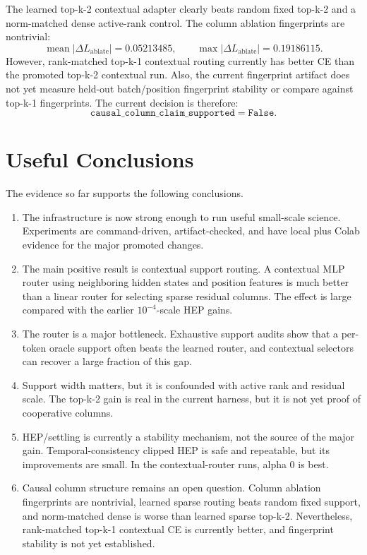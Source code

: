 \documentclass[11pt]{article}
\begin{document}
The learned top-k-2 contextual adapter clearly beats random fixed top-k-2 and a
norm-matched dense active-rank control. The column ablation fingerprints are
nontrivial:
\[
\operatorname{mean} |\Delta L_{\mathrm{ablate}}| = 0.05213485,
\qquad
\max |\Delta L_{\mathrm{ablate}}| = 0.19186115.
\]
However, rank-matched top-k-1 contextual routing currently has better CE than
the promoted top-k-2 contextual run. Also, the current fingerprint artifact
does not yet measure held-out batch/position fingerprint stability or compare
against top-k-1 fingerprints. The current decision is therefore:
\[
\texttt{causal\_column\_claim\_supported} = \texttt{False}.
\]

\section{Useful Conclusions}

The evidence so far supports the following conclusions.

\begin{enumerate}
  \item The infrastructure is now strong enough to run useful small-scale
  science. Experiments are command-driven, artifact-checked, and have local
  plus Colab evidence for the major promoted changes.

  \item The main positive result is contextual support routing. A contextual
  MLP router using neighboring hidden states and position features is much
  better than a linear router for selecting sparse residual columns. The effect
  is large compared with the earlier \(10^{-4}\)-scale HEP gains.

  \item The router is a major bottleneck. Exhaustive support audits show that a
  per-token oracle support often beats the learned router, and contextual
  selectors can recover a large fraction of this gap.

  \item Support width matters, but it is confounded with active rank and
  residual scale. The top-k-2 gain is real in the current harness, but it is not
  yet proof of cooperative columns.

  \item HEP/settling is currently a stability mechanism, not the source of the
  major gain. Temporal-consistency clipped HEP is safe and repeatable, but its
  improvements are small. In the contextual-router runs, alpha 0 is best.

  \item Causal column structure remains an open question. Column ablation
  fingerprints are nontrivial, learned sparse routing beats random fixed
  support, and norm-matched dense is worse than learned sparse top-k-2.
  Nevertheless, rank-matched top-k-1 contextual CE is currently better, and
  fingerprint stability is not yet established.
\end{enumerate}
\end{document}

